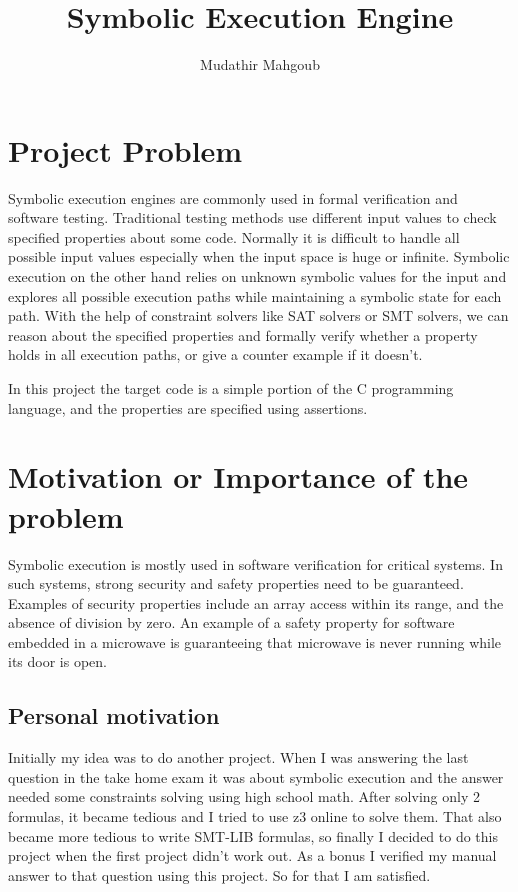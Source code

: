 \documentclass[12pt,a4paper]{article}
\author{Mudathir Mahgoub}
\title{Symbolic Execution Engine}
\begin{document}
\maketitle

\section {Project Problem}

Symbolic execution engines are commonly used in formal verification and software testing. Traditional testing methods use different input values to check specified properties about some code. Normally it is difficult to handle all possible input values especially when the input space is huge or infinite. Symbolic execution on the other hand relies on unknown symbolic values for the input and explores all possible execution paths while maintaining a symbolic state for each path. With the help of constraint solvers like SAT solvers or SMT solvers, we can reason about the specified properties and formally verify whether a property holds in all execution paths, or give a counter example if it doesn't. 

In this project the target code is a simple portion of the C programming language, and the properties are specified using assertions. 

\section{Motivation or Importance of the problem}

Symbolic execution is mostly used in software verification for critical systems. In such systems, strong security and safety properties need to be guaranteed. Examples of security properties include an array access within its range, and the absence of division by zero. An example of a safety property for software embedded in a microwave is guaranteeing that microwave is never running while its door is open. 

\subsection{Personal motivation}
Initially my idea was to do another project. When I was answering the last question in the take home exam it was about symbolic execution and the answer needed some constraints solving using high school math. After solving only 2 formulas, it became tedious and I tried to use z3 online to solve them. That also became more tedious to write SMT-LIB formulas, so finally I decided to do this project when the first project didn't work out. As a bonus I verified my manual answer to that question using this project. So for that I am satisfied. 
\end{document}
